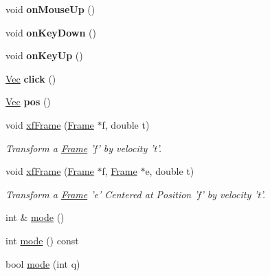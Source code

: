 \begin{DoxyCompactItemize}
\item 
\hypertarget{classvsr_1_1_interface_ae57ecf949813a9ba672bdd5cdca244c3}{void {\bfseries on\-Mouse\-Up} ()}\label{classvsr_1_1_interface_ae57ecf949813a9ba672bdd5cdca244c3}

\item 
\hypertarget{classvsr_1_1_interface_a85a16751281ee50f5b520fb1d2774f2e}{void {\bfseries on\-Key\-Down} ()}\label{classvsr_1_1_interface_a85a16751281ee50f5b520fb1d2774f2e}

\item 
\hypertarget{classvsr_1_1_interface_a3a7990f9db4053c1219c28aacfa06f01}{void {\bfseries on\-Key\-Up} ()}\label{classvsr_1_1_interface_a3a7990f9db4053c1219c28aacfa06f01}

\item 
\hypertarget{classvsr_1_1_interface_a03320c1bff78b0213a97233d2fc28760}{\hyperlink{namespacevsr_a0d061c30ac198a710a1b92dd8b343273}{Vec} {\bfseries click} ()}\label{classvsr_1_1_interface_a03320c1bff78b0213a97233d2fc28760}

\item 
\hypertarget{classvsr_1_1_interface_a1764d13654ad1c0d02df60c55334b672}{\hyperlink{namespacevsr_a0d061c30ac198a710a1b92dd8b343273}{Vec} {\bfseries pos} ()}\label{classvsr_1_1_interface_a1764d13654ad1c0d02df60c55334b672}

\item 
\hypertarget{classvsr_1_1_interface_a29366c4c2a9437d64de77a4d59cab5d3}{void \hyperlink{classvsr_1_1_interface_a29366c4c2a9437d64de77a4d59cab5d3}{xf\-Frame} (\hyperlink{classvsr_1_1_frame}{Frame} $\ast$f, double t)}\label{classvsr_1_1_interface_a29366c4c2a9437d64de77a4d59cab5d3}

\begin{DoxyCompactList}\small\item\em Transform a \hyperlink{classvsr_1_1_frame}{Frame} 'f' by velocity 't'. \end{DoxyCompactList}\item 
\hypertarget{classvsr_1_1_interface_a8027dce5e4e2d45fc78c75accc2278b8}{void \hyperlink{classvsr_1_1_interface_a8027dce5e4e2d45fc78c75accc2278b8}{xf\-Frame} (\hyperlink{classvsr_1_1_frame}{Frame} $\ast$f, \hyperlink{classvsr_1_1_frame}{Frame} $\ast$e, double t)}\label{classvsr_1_1_interface_a8027dce5e4e2d45fc78c75accc2278b8}

\begin{DoxyCompactList}\small\item\em Transform a \hyperlink{classvsr_1_1_frame}{Frame} 'e' Centered at Position 'f' by velocity 't'. \end{DoxyCompactList}\item 
int \& \hyperlink{classvsr_1_1_interface_a17652642fba1b28ef8b3759af5dedde0}{mode} ()
\item 
int \hyperlink{classvsr_1_1_interface_ac3ea2d8e5afd1e8387afa62b4a38924f}{mode} () const 
\item 
\hypertarget{classvsr_1_1_interface_a30c8975d2c534d53fb15ce02e77896a3}{bool \hyperlink{classvsr_1_1_interface_a30c8975d2c534d53fb15ce02e77896a3}{mode} (int q)}\label{classvsr_1_1_interface_a30c8975d2c534d53fb15ce02e77896a3}


\end{DoxyCompactItemize}
